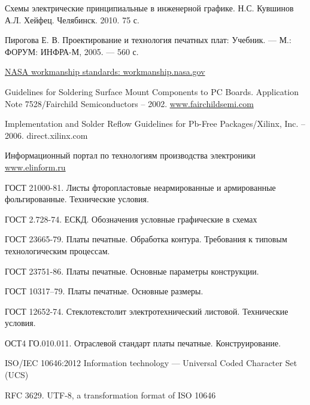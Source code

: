  Схемы электрические принципиальные в инженерной графике.
    Н.С. Кувшинов А.Л. Хейфец. Челябинск. 2010. 75 с.

 Пирогова Е. В. Проектирование и технология печатных плат:
    Учебник. --- М.: ФОРУМ: ИНФРА-М, 2005. --- 560 с.

    \href{http://workmanship.nasa.gov/insp.html}
         {NASA workmanship standards: workmanship.nasa.gov}

 Guidelines for Soldering Surface Mount
    Components to PC Boards.
    Application Note 7528/Fairchild Semiconductors – 2002.
    \href{http://www.fairchildsemi.com}{www.fairchildsemi.com}

 Implementation and Solder Reflow Guidelines
    for Pb-Free Packages/Xilinx, Inc. – 2006.  direct.xilinx.com

 Информационный портал по технологиям производства электроники
    \href{http://www.elinform.ru}{www.elinform.ru}

 ГОСТ 21000-81. Листы фторопластовые неармированные и
    армированные фольгированные. Технические условия.

 ГОСТ 2.728-74. ЕСКД. Обозначения условные графические в
    схемах

 ГОСТ 23665-79. Платы печатные. Обработка контура.
    Требования к типовым технологическим процессам.

 ГОСТ 23751-86. Платы печатные. Основные параметры
    конструкции.

 ГОСТ 10317–79. Платы печатные. Основные размеры.

 ГОСТ 12652-74. Стеклотекстолит электротехнический
    листовой. Технические условия.

 ОСТ4 ГО.010.011. Отраслевой стандарт платы печатные.
    Конструирование.

 ISO/IEC 10646:2012 Information technology ---
    Universal Coded Character Set (UCS)

 RFC 3629. UTF-8, a transformation format of ISO 10646
